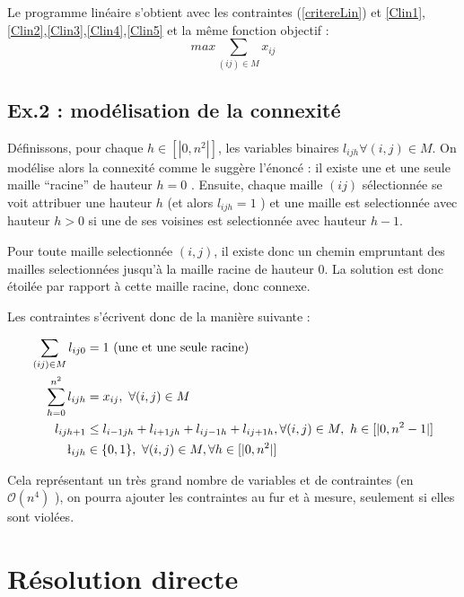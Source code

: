 \documentclass[12pt,a4paper]{article}
\begin{document}
Le programme linéaire s'obtient avec les contraintes (\ref{critereLin}) et \ref{Clin1}, \ref{Clin2},\ref{Clin3},\ref{Clin4},\ref{Clin5} et la même fonction objectif : $$max \sum_{(ij)\in M} x_{ij}$$

\vspace{1cm}


\subsection{Ex.2 : modélisation de la connexité }

Définissons, pour chaque $h\in [| 0,n^2 |] $, les variables binaires $ l_{ijh} \forall (i,j) \in M$.
On modélise alors la connexité comme le suggère l'énoncé : il existe une et une seule maille ``racine''  de hauteur $h=0$ . Ensuite, chaque maille $(ij)$ sélectionnée se voit attribuer une hauteur $h$ (et alors $l_{ijh}=1$ ) et une maille est selectionnée avec hauteur $h>0$ si une de ses voisines est selectionnée avec hauteur $h-1$.

Pour toute maille selectionnée $(i,j)$, il existe donc un chemin empruntant des mailles selectionnées jusqu'à la maille racine de hauteur 0. La solution est donc étoilée par rapport à cette maille racine, donc connexe.

Les contraintes s'écrivent donc de la manière suivante : 

\begin{align} \label{Cconnex}
\sum_{(ij)\in M} l_{ij0} &= 1 \ \text{(une et une seule racine)} \\
\sum_{h=0}^{n^2} l_{ijh} &= x_{ij} , \ \forall (i,j) \in M \\
l_{ijh+1} & \leq l_{i-1jh} +l_{i+1jh} +l_{ij-1h} +l_{ij+1h}, \forall (i,j) \in M, \ h\in [|0, n^2 -1|] \\
\l_{ijh} & \in \{0,1\} , \ \forall (i,j) \in M, \forall h\in [|0, n^2|] 
\end{align}

Cela représentant un très grand nombre de variables et de contraintes (en $\mathcal{O}(n^4) $ ), on pourra ajouter les contraintes au fur et à mesure, seulement si elles sont violées.


\vspace{2cm}


\section{Résolution directe}
\end{document}

